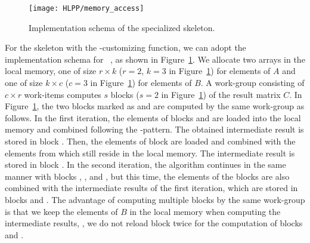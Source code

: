 \begin{figure}[b]
  \centering
  \texttt{[image: HLPP/memory\_access]}
  \caption{Implementation schema of the specialized \allpairs skeleton.}
  \label{fig:memory_access}
\end{figure}
For the \allpairs skeleton with the \zip-\reduce customizing function, we can adopt the implementation schema for \GPUs~\cite{SarjeAl2013}, as shown in Figure~\ref{fig:memory_access}.
We allocate two arrays in the local memory, one of size $r\times k$ ($r=2$, $k=3$ in Figure~\ref{fig:memory_access}) for elements of $A$ and one of size $k\times c$ ($c=3$ in Figure~\ref{fig:memory_access}) for elements of $B$.
A work-group consisting of $c\times r$ work-items computes $s$ blocks ($s=2$ in Figure~\ref{fig:memory_access}) of the result matrix $C$.
In Figure~\ref{fig:memory_access}, the two blocks marked as  and  are computed by the same work-group as follows.
In the first iteration, the elements of blocks  and  are loaded into the local memory and combined following the \zip-\reduce pattern.
The obtained intermediate result is stored in block .
Then, the elements of block  are loaded and combined with the elements from  which still reside in the local memory.
The intermediate result is stored in block .
In the second iteration, the algorithm continues in the same manner with blocks , , and , but this time, the elements of the blocks are also combined with the intermediate results of the first iteration, which are stored in blocks  and .
The advantage of computing multiple blocks by the same work-group is that we keep the elements of $B$ in the local memory when computing the intermediate results, \ie, we do not reload block  twice for the computation of blocks  and .

